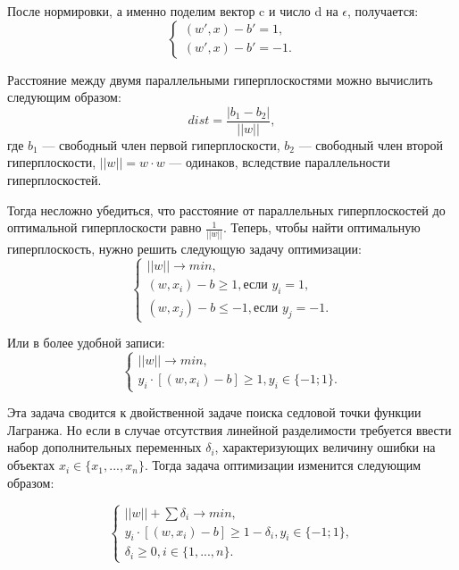 После нормировки, а именно поделим вектор c и число d на $\epsilon$, получается:
\begin{equation}
\begin{cases}
(w', x) - b' = 1,\\
(w', x) - b' = -1.
\end{cases}
\end{equation}

Расстояние между двумя параллельными гиперплоскостями можно вычислить следующим образом:
\begin{equation}
    dist = \frac{|b_1 - b_2|}{||w||},
\end{equation}
где $b_1$ --- свободный член первой гиперплоскости, $b_2$ --- свободный член второй гиперплоскости, $||w|| = w \cdot w$ --- одинаков, вследствие параллельности гиперплоскостей.

Тогда несложно убедиться, что расстояние от параллельных гиперплоскостей до оптимальной гиперплоскости равно $\frac{1}{||w||}$. Теперь, чтобы найти оптимальную гиперплоскость, нужно решить следующую задачу оптимизации:
\begin{equation}
    \begin{cases}
    ||w|| \longrightarrow min, \\
    (w, x_i) - b \ge 1, \text{если }  y_i = 1, \\
    (w, x_j) - b \le -1, \text{если }  y_j = -1.
    \end{cases}
\end{equation}

Или в более удобной записи:
\begin{equation}
    \begin{cases}
    ||w|| \longrightarrow min, \\
    y_i \cdot [(w, x_i) - b] \ge 1, y_i \in \{-1; 1\}.
    \end{cases}
\end{equation}

Эта задача сводится к двойственной задаче поиска седловой точки функции Лагранжа. Но если в случае отсутствия линейной разделимости требуется ввести набор дополнительных переменных $\delta_i$, характеризующих величину ошибки на объектах $x_i \in \{x_1, ..., x_n\}$. Тогда задача оптимизации изменится следующим образом:

\begin{equation}
    \begin{cases}
    ||w|| + \sum\delta_i\longrightarrow min, \\
    y_i \cdot [(w, x_i) - b] \ge 1 - \delta_i, y_i \in \{-1; 1\}, \\
    \delta_i \ge 0, i \in \{1, ..., n\}.
    \end{cases}
\end{equation}

